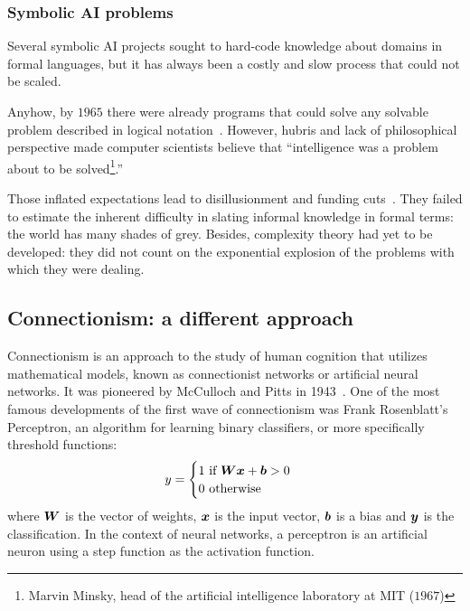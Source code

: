 \subsubsection{Symbolic AI problems} Several symbolic AI projects sought to hard-code knowledge about domains in formal languages, but it has always been a costly and slow process that could not be scaled.

Anyhow, by $1965$ there were already programs that could solve any solvable problem described in logical notation~\cite[p.4]{russell:2010}. However, hubris and lack of philosophical perspective made computer scientists believe that ``intelligence was a problem about to be solved\footnote{Marvin Minsky, head of the artificial intelligence laboratory at MIT ($1967$)}.''

Those inflated expectations lead to disillusionment and funding cuts~\cite{russel:2010}. They failed to estimate the inherent difficulty in slating informal knowledge in formal terms: the world has many shades of grey. Besides, complexity theory had yet to be developed: they did not count on the exponential explosion of the problems with which they were dealing.

\subsection{Connectionism: a different approach}

Connectionism is an approach to the study of human cognition that utilizes mathematical models, known as connectionist networks or artificial neural networks. It was pioneered by McCulloch and Pitts in 1943~\cite{mcculloch:1943}. One of the most famous developments of the first wave of connectionism was Frank Rosenblatt's Perceptron, an algorithm for learning binary classifiers, or more specifically threshold functions:
\begin{align}
	y=
	\begin{cases}
		1 \text{ if } {\bm{W}}{\bm{x}} + {\bm{b}} > 0\\
		0 \text{ otherwise }
	\end{cases}
\end{align}
where \({\bm{W}} \) is the vector of weights, \({\bm{x}} \) is the input vector, \({\bm{b}} \) is a bias and \({\bm{y}} \) is the classification. In the context of neural networks, a perceptron is an artificial neuron using a step function as the activation function.

